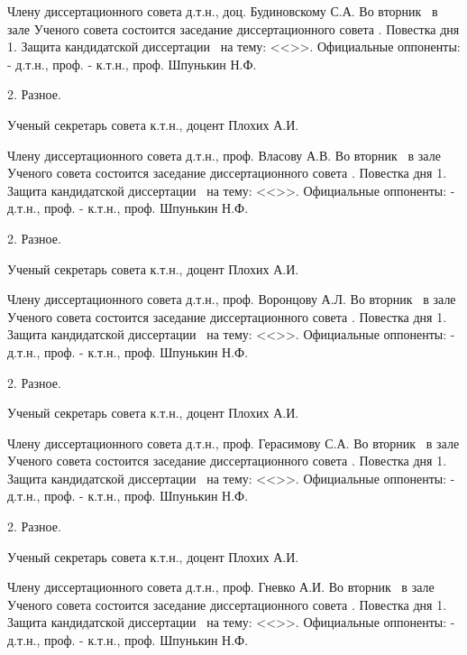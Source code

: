 Члену диссертационного совета
д.т.н., доц. Будиновскому С.А.
Во вторник \ в зале Ученого совета состоится заседание диссертационного совета .
Повестка дня
1.	Защита кандидатской диссертации \thesisAuthorLastNameKemFull\ на тему: <<\thesisTitle>>.
Официальные оппоненты:	- д.т.н., проф.	\opponentOneFioShort
- к.т.н., проф.	Шпунькин Н.Ф.

2.	Разное.

Ученый секретарь совета
к.т.н., доцент		Плохих А.И. 



Члену диссертационного совета
д.т.н., проф. Власову А.В.
Во вторник \ в зале Ученого совета состоится заседание диссертационного совета .
Повестка дня
1.	Защита кандидатской диссертации \thesisAuthorLastNameKemFull\ на тему: <<\thesisTitle>>.
Официальные оппоненты:	- д.т.н., проф.	\opponentOneFioShort
- к.т.н., проф.	Шпунькин Н.Ф.

2.	Разное.

Ученый секретарь совета
к.т.н., доцент		Плохих А.И. 



Члену диссертационного совета
д.т.н., проф. Воронцову А.Л.
Во вторник \ в зале Ученого совета состоится заседание диссертационного совета .
Повестка дня
1.	Защита кандидатской диссертации \thesisAuthorLastNameKemFull\ на тему: <<\thesisTitle>>.
Официальные оппоненты:	- д.т.н., проф.	\opponentOneFioShort
- к.т.н., проф.	Шпунькин Н.Ф.

2.	Разное.

Ученый секретарь совета
к.т.н., доцент		Плохих А.И. 



Члену диссертационного совета
д.т.н., проф. Герасимову С.А.
Во вторник \ в зале Ученого совета состоится заседание диссертационного совета .
Повестка дня
1.	Защита кандидатской диссертации \thesisAuthorLastNameKemFull\ на тему: <<\thesisTitle>>.
Официальные оппоненты:	- д.т.н., проф.	\opponentOneFioShort
- к.т.н., проф.	Шпунькин Н.Ф.

2.	Разное.

Ученый секретарь совета
к.т.н., доцент		Плохих А.И. 



Члену диссертационного совета
д.т.н., проф. Гневко А.И.
Во вторник \ в зале Ученого совета состоится заседание диссертационного совета .
Повестка дня
1.	Защита кандидатской диссертации \thesisAuthorLastNameKemFull\ на тему: <<\thesisTitle>>.
Официальные оппоненты:	- д.т.н., проф.	\opponentOneFioShort
- к.т.н., проф.	Шпунькин Н.Ф.

